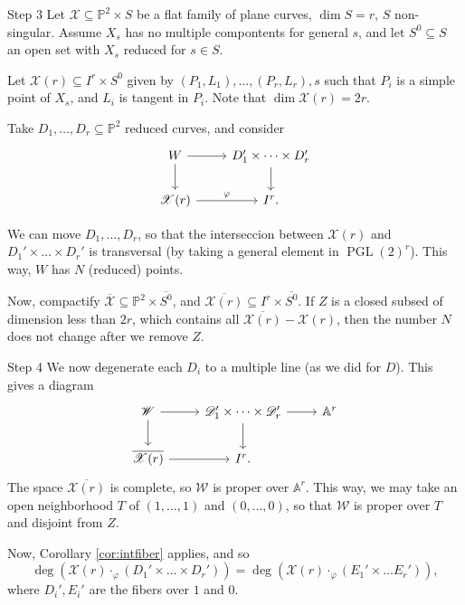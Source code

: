 \documentclass{beamer}
\renewcommand{\P}{\mathbb{P}}
\newcommand{\A}{\mathbb{A}}
\newcommand{\D}{\mathscr{D}}
\newcommand{\W}{\mathscr{W}}
\newcommand{\X}{\mathscr{X}}
\begin{document}
\begin{frame}[fragile]{Step 3}
Let $\mathscr{X} \subseteq \P^2 \times S$ be a flat family of plane curves, $\dim S=r$, $S$ non-singular. Assume $X_s$ has no multiple compontents for general $s$, and let $S^0 \subseteq S$ an open set with $X_s$ reduced for $s \in S$. 

Let $\X(r)\subseteq I^r \times S^0$ given by $(P_1, L_1), \dots, (P_r, L_r), s$ such that $P_i$ is a simple point of $X_s$, and $L_i$ is tangent in $P_i$. Note that $\dim \X(r)=2r$.

\pause 

Take $D_1, \dots, D_r \subseteq \P^2$ reduced curves, and consider
\[ \begin{tikzcd} W \arrow[r] \arrow[d] & D_1' \times \dots \times D_r' \arrow[d] \\ \X(r) \arrow[r, "\varphi"] & I^r. \end{tikzcd} \]
\end{frame}



\begin{frame}
We can move $D_1, \dots, D_r$, so that the interseccion between $\X(r)$ and $D_1' \times \dots \times D_r'$ is transversal (by taking a general element in $\operatorname{PGL}(2)^r$). This way, $W$ has $N$ (reduced) points. 

Now, compactify $\overline{\X} \subseteq \P^2 \times \overline{S^0}$, and $\overline{\X(r)}\subseteq I^r \times \overline{S^0}$. If $Z$ is a closed subsed of dimension less than $2r$, which contains all $\overline{\X(r)}-\X(r)$, then the number $N$ does not change after we remove $Z$.
\end{frame}



\begin{frame}[fragile]{Step 4}
We now degenerate each $D_i$ to a multiple line (as we did for $D$). This gives a diagram
\[ \begin{tikzcd} \W \arrow[r] \arrow[d] & \D_1' \times \dots \times \D_r' \arrow[r] \arrow[d] & \A^r \\ \overline{\X(r)} \arrow[r]& I^r. \end{tikzcd} \]
The space $\overline{\X(r)}$ is complete, so $\W$ is proper over $\A^r$. This way, we may take an open neighborhood $T$ of $(1, \dots, 1)$ and $(0, \dots, 0)$, so that $\W$ is proper over $T$ and disjoint from $Z$. 

\pause

Now, Corollary \ref{cor:intfiber} applies, and so
\[ \deg(\X(r) \cdot_\varphi (D_1' \times \dots \times D_r')) = \deg(\X(r) \cdot_\varphi (E_1' \times \dots E_r')), \]
where $D_i', E_i'$ are the fibers over $1$ and $0$.
\end{frame}
\end{document}
